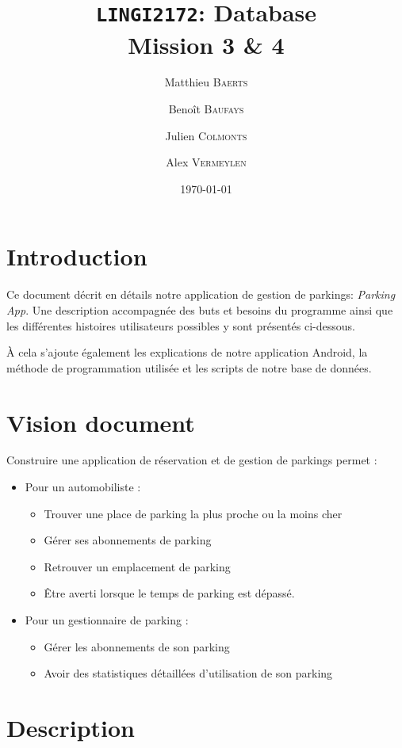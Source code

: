\documentclass[a4paper,11pt]{article}
\title{\texttt{LINGI2172}: Database\\Mission 3 \& 4}
\author{Matthieu \textsc{Baerts} \and Benoît \textsc{Baufays} \and Julien \textsc{Colmonts} \and Alex \textsc{Vermeylen}}
\date{\today}
\begin{document}
\maketitle
\tableofcontents

\section*{Introduction}
Ce document décrit en détails notre application de gestion de parkings: \textit{Parking App}. Une description accompagnée des buts et besoins du programme ainsi que les différentes histoires utilisateurs possibles y sont présentés ci-dessous.

À cela s'ajoute également les explications de notre application Android, la méthode de programmation utilisée et les scripts de notre base de données.


\section{Vision document}

Construire une application de réservation et de gestion de parkings permet :
\begin{itemize}
  \item Pour un automobiliste :
  \begin{itemize}
  	\item Trouver une place de parking la plus proche ou la moins cher
    \item Gérer ses abonnements de parking
    \item Retrouver un emplacement de parking
    \item Être averti lorsque le temps de parking est dépassé.
  \end{itemize}
  \item Pour un gestionnaire de parking :
  \begin{itemize}
    \item Gérer les abonnements de son parking
    \item Avoir des statistiques détaillées d'utilisation de son parking
  \end{itemize}
\end{itemize}


\section{Description}
\end{document}
